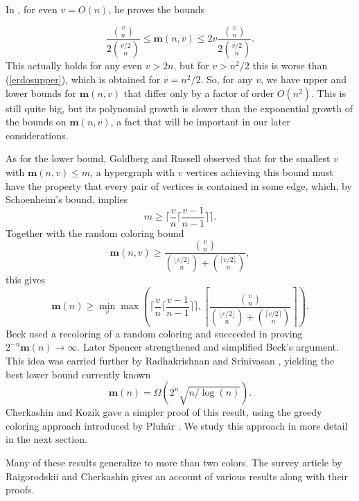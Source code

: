 \documentclass[a4paper,12pt]{article}
\begin{document}
In \cite{combprob3}, for even $v=O(n)$, he proves the bounds

\begin{equation}\label{erdosbounds}
\frac{\genfrac(){0pt}1{v}{n}}{2\genfrac(){0pt}1{v/2}{n}}\le \mathbf m(n,v)
\le 2v
\frac{\genfrac(){0pt}1{v}{n}}{2\genfrac(){0pt}1{v/2}{n}}.\end{equation}
This actually holds for any even $v>2n$, but for $v>n^2/2$ this is worse than
(\ref{erdosupper}), which is obtained for $v=n^2/2$.
So, for any $v$, we have upper and lower bounds for $\mathbf m(n,v)$ 
that differ only by a
factor of order $O(n^2)$. This is still quite big, but its polynomial
growth is slower than the exponential growth of the bounds on $\mathbf m(n,v)$,
a fact that will be important in our later considerations.


As for the lower bound, 
Goldberg and Russell\cite{gold} observed that for the smallest $v$ 
with $\mathbf m(n,v)\le m$, a hypergraph with $v$ vertices
achieving this bound must have the property
that every pair of vertices is contained in some edge, which, by 
Schoenheim's bound, implies
\begin{equation}\label{schoen}
m\ge\lceil\frac{v}{n}\lceil\frac{v-1}{n-1}\rceil\rceil.\end{equation}
Together with the random coloring bound
\begin{equation}\label{goldlow}\mathbf m(n,v)\ge\frac{\genfrac(){0pt}1{v}{n}}
{\genfrac(){0pt}1{\lfloor v/2\rfloor}{n}+
\genfrac(){0pt}1{\lceil v/2\rceil}{n}},\end{equation}
this gives
\begin{equation}\label{goldbound}\mathbf m(n)\ge\min_v\max\left(
\lceil\frac{v}{n}\lceil\frac{v-1}{n-1}\rceil\rceil,
\left\lceil\frac{\genfrac(){0pt}1{v}{n}}
{\genfrac(){0pt}1{\lfloor v/2\rfloor}{n}+
\genfrac(){0pt}1{\lceil v/2\rceil}{n}}
\right\rceil\right).\end{equation}
Beck \cite{beck1,beck2} used a recoloring of a random coloring and
succeeded in proving $2^{-n}\mathbf m(n)\to\infty$. Later
Spencer \cite{spencer} strengthened and simplified Beck's argument.
This idea was carried further
by
Radhakrishnan and Srinivasan \cite{srini}, yielding the best
lower bound currently known
\[\mathbf m(n)=\Omega(
2^n \sqrt{n/\log(n)}).\]
Cherkashin and Kozik \cite{cherk} gave a simpler proof of this
result, 
using the greedy coloring approach introduced by 
Pluhár \cite{pluhar}. We study this approach in more detail in the next 
section.

Many of these results generalize to more than two colors. The survey 
article by Raigorodskii and Cherkashin \cite{raicher} gives an account of 
various results along with their proofs.
\end{document}
